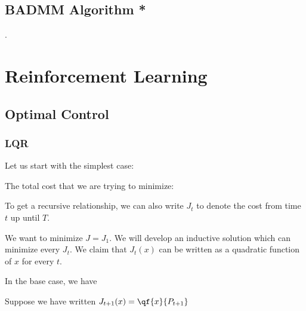 \documentclass[12pt]{article}
\begin{document}
\subsection{BADMM Algorithm *}
.
\section{Reinforcement Learning}

\subsection{Optimal Control}

\subsubsection{LQR}

Let us start with the simplest case:


The total cost that we are trying to minimize:


To get a recursive relationship, we can also write $J_t$ to denote the cost from time $t$ up until $T$. 


We want to minimize $J = J_1$. We will develop an inductive solution which can minimize every $J_t$. We claim that $J_{t}(x)$ can be written as a quadratic function of $x$ for every $t$. 

In the base case, we have 

Suppose we have written $J_{t+1}(x) = \qf{x}{P_{t+1}}$

\end{document}
